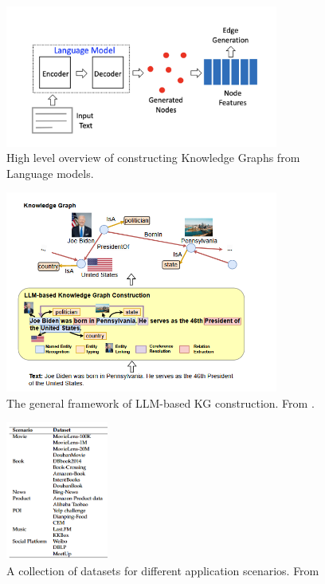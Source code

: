 \documentclass[a4paper]{article}
\begin{document}
\begin{figure}[H]
\centering
\includegraphics[width=0.8\textwidth]{img/Idea.png}
\caption{High level overview of constructing Knowledge Graphs from Language models.}
\label{fig:kg_construction}
\end{figure}
    
\begin{figure}[H]
\centering
\includegraphics[width=0.8\textwidth]{img/KG_construction.png}
\caption{The general framework of LLM-based KG construction. From \cite{pan2023unifying}.}
\label{fig:kg_construction}
\end{figure}

\begin{figure}[H]
\centering
\includegraphics[width=0.3\textwidth]{img/datasets.png}
\caption{A collection of datasets for different application scenarios. From \cite{guo2020survey} }
\label{fig:datasets}
\end{figure}
\end{document}
